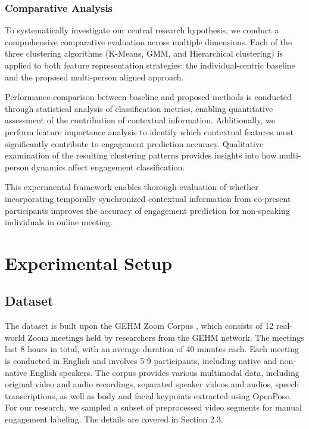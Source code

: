 \documentclass[
]{ceurart}
\begin{document}
\subsubsection{Comparative Analysis}
To systematically investigate our central research hypothesis, we conduct a comprehensive comparative evaluation across multiple dimensions. Each of the three clustering algorithms (K-Means, GMM, and Hierarchical clustering) is applied to both feature representation strategies: the individual-centric baseline and the proposed multi-person aligned approach.

Performance comparison between baseline and proposed methods is conducted through statistical analysis of classification metrics, enabling quantitative assessment of the contribution of contextual information. Additionally, we perform feature importance analysis to identify which contextual features most significantly contribute to engagement prediction accuracy. Qualitative examination of the resulting clustering patterns provides insights into how multi-person dynamics affect engagement classification.

This experimental framework enables thorough evaluation of whether incorporating temporally synchronized contextual information from co-present participants improves the accuracy of engagement prediction for non-speaking individuals in online meeting.

\section{Experimental Setup}
\subsection{Dataset}
The dataset is built upon the GEHM Zoom Corpus \cite{paggio2024gehm}, which consists of 12 real-world Zoom meetings held by researchers from the GEHM network. The meetings last 8 hours in total, with an average duration of 40 minutes each. Each meeting is conducted in English and involves 5-9 participants, including native and non-native English speakers. The corpus provides various multimodal data, including original video and audio recordings, separated speaker videos and audios, speech transcriptions, as well as body and facial keypoints extracted using OpenPose\cite{cao2019openpose}. For our research, we sampled a subset of preprocessed video segments for manual engagement labeling. The details are covered in Section 2.3.
\end{document}
